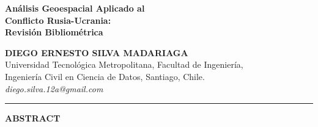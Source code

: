 \documentclass[12pt, a4paper]{article}
\begin{document}
\color{darktext}
\singlespacing   %

\thispagestyle{empty}
\setcounter{page}{1}

\noindent
\begin{minipage}[t]{0.63\textwidth}

  \begin{tcolorbox}[
      colback=primary,
      colframe=primary,
      arc=0pt,
      boxrule=0pt,
      left=10pt, right=10pt, top=14pt, bottom=14pt,
      width=\textwidth
  ]
    {\fontsize{18}{24}\selectfont\bfseries\color{white}
    Análisis Geoespacial Aplicado al\\[0.3cm]
    Conflicto Rusia-Ucrania:\\[0.3cm]
    Revisión Bibliométrica\\[0.3cm]
    \par}
  \end{tcolorbox}

  \vspace{0.4cm}

  {\color{primary}\bfseries\small DIEGO ERNESTO SILVA MADARIAGA}\\[0.1cm]
  {\color{darktext}\footnotesize Universidad Tecnológica Metropolitana, Facultad de Ingeniería,\\
  Ingeniería Civil en Ciencia de Datos, Santiago, Chile.}\\[0.1cm]
  {\color{secondary}\footnotesize\itshape diego.silva.12a@gmail.com}

  \vspace{0.4cm}
  {\color{accent}\rule{\textwidth}{0.8pt}}
  \vspace{0.3cm}

  {\color{primary}\bfseries\small ABSTRACT}


\end{minipage}
\end{document}
